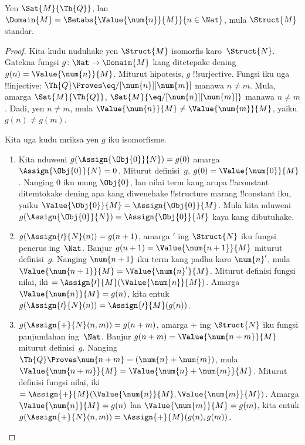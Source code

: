 \documentclass[../../../include/open-logic-section]{subfiles}
\begin{document}
\begin{prop}
Yen $\Sat{M}{\Th{Q}}$,
lan $\Domain{M} =
\Setabs{\Value{\num{n}}{M}}{n
  \in \Nat}$,
mula $\Struct{M}$ standar.
\end{prop}

\begin{proof}
Kita kudu nuduhake yen
$\Struct{M}$ isomorfis
karo~$\Struct{N}$.
Gatekna fungsi
$g\colon \Nat \to \Domain{M}$
kang ditetepake dening
$g(n) = \Value{\num{n}}{M}$.
Miturut hipotesis,
$g$ !!{surjective}.
Fungsi iku uga
!!{injective}:
$\Th{Q} \Proves
\eq/[\num{n}][\num{m}]$
manawa $n \neq m$.
Mula, amarga
$\Sat{M}{\Th{Q}}$,
$\Sat{M}{\eq/[\num{n}][\num{m}]}$
manawa $n \neq
m$. Dadi, yen
$n \neq m$,
mula $\Value{\num{n}}{M}
\neq \Value{\num{m}}{M}$,
yaiku $g(n) \neq g(m)$.

Kita uga kudu mriksa yen
$g$ iku isomorfisme.
\begin{enumerate}
\item Kita nduweni
  $g(\Assign{\Obj{0}}{N}) = g(0)$
  amarga
  $\Assign{\Obj{0}}{N} = 0$.
  Miturut definisi~$g$,
  $g(0) = \Value{\num{0}}{M}$.
  Nanging $\num{0}$
  iku mung $\Obj{0}$,
  lan nilai term kang
  arupa !!a{constant}
  ditemtokake dening apa
  kang diwenehake
  !!{structure} marang
  !!{constant} iku,
  yaiku
  $\Value{\Obj{0}}{M} =
  \Assign{\Obj{0}}{M}$.
  Mula kita nduweni
  $g(\Assign{\Obj{0}}{N}) =
  \Assign{\Obj{0}}{M}$
  kaya kang dibutuhake.
\item $g(\Assign{\prime}{N}(n)) =
  g(n+1)$, amarga
  $\prime$ ing
  $\Struct{N}$ iku
  fungsi penerus ing~$\Nat$.
  Banjur $g(n+1) =
  \Value{\num{n+1}}{M}$
  miturut definisi~$g$.
  Nanging $\num{n+1}$
  iku term kang padha karo
  $\num{n}'$, mula
  $\Value{\num{n+1}}{M} =
  \Value{\num{n}'}{M}$.
  Miturut definisi
  fungsi nilai, iki
  $= \Assign{\prime}{M}(
  \Value{\num{n}}{M})$.
  Amarga
  $\Value{\num{n}}{M} = g(n)$,
  kita entuk
  $g(\Assign{\prime}{N}(n)) =
  \Assign{\prime}{M}(g(n))$.
\item $g(\Assign{+}{N}(n,m)) =
  g(n+m)$, amarga
  $+$ ing $\Struct{N}$
  iku fungsi panjumlahan
  ing~$\Nat$.
  Banjur $g(n+m) =
  \Value{\num{n+m}}{M}$
  miturut definisi~$g$.
  Nanging
  $\Th{Q} \Proves
  \num{n+m} =
  (\num{n} + \num{m})$,
  mula $\Value{\num{n+m}}{M} =
  \Value{\num{n}+\num{m}}{M}$.
  Miturut definisi
  fungsi nilai, iki
  $=
  \Assign{+}{M}(
  \Value{\num{n}}{M},
  \Value{\num{m}}{M})$.
  Amarga
  $\Value{\num{n}}{M} = g(n)$
  lan $\Value{\num{m}}{M} = g(m)$,
  kita entuk
  $g(\Assign{+}{N}(n, m)) =
  \Assign{+}{M}(g(n), g(m))$.

\end{enumerate}
\end{proof}
\end{document}
